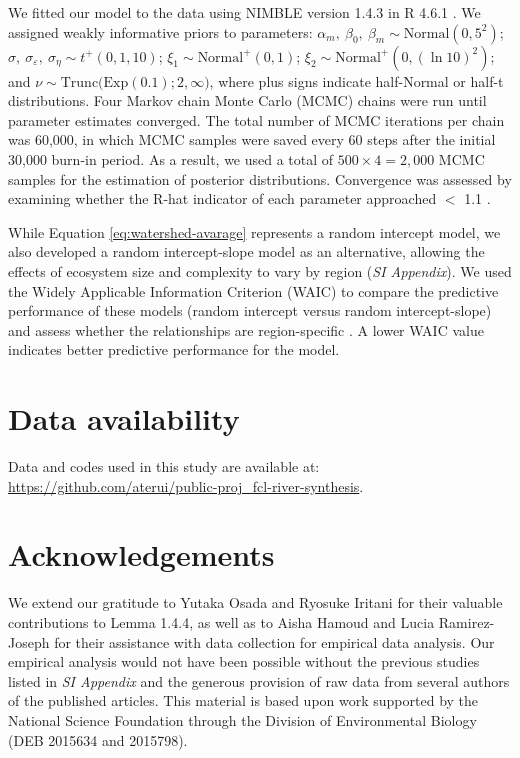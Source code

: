 \documentclass[9pt,twocolumn,twoside]{pnas-new}
\begin{document}
We fitted our model to the data using NIMBLE version 1.4.3 \citep{nimble, pkg_nimble} in R 4.6.1 \citep{r_program}.
We assigned weakly informative priors to parameters: $\alpha_m,~\beta_0,~\beta_m \sim \mbox{Normal}(0, 5^2)$; $\sigma,~\sigma_{\varepsilon},~\sigma_{\eta} \sim t^+(0, 1, 10)$; $\xi_1 \sim \mbox{Normal}^+(0, 1)$; $\xi_2 \sim \mbox{Normal}^+(0, (\ln 10)^2)$; and $\nu \sim \mbox{Trunc(Exp}(0.1); 2, \infty)$, where plus signs indicate half-Normal or half-t distributions. 
Four Markov chain Monte Carlo (MCMC) chains were run until parameter estimates
converged.
The total number of MCMC iterations per chain was 60,000, in which MCMC samples were saved every 60 steps after the initial 30,000 burn-in period.
As a result, we used a total of $500 \times 4 = 2,000$ MCMC samples for the estimation of posterior distributions.
Convergence was assessed by examining whether the R-hat indicator of each parameter approached $<$ 1.1 \citep{gelman2013bayesian}.

While Equation \ref{eq:watershed-avarage} represents a random intercept model, we also developed a random intercept-slope model as an alternative, allowing the effects of ecosystem size and complexity to vary by region (\textit{SI Appendix}).
We used the Widely Applicable Information Criterion (WAIC) to compare the predictive performance of these models (random intercept versus random intercept-slope) and assess whether the relationships are region-specific \citep{watanabe_asymptotic_2010}.
A lower WAIC value indicates better predictive performance for the model.

\section*{Data availability}

Data and codes used in this study are available at:
\url{https://github.com/aterui/public-proj_fcl-river-synthesis}.

\section*{Acknowledgements}

We extend our gratitude to Yutaka Osada and Ryosuke Iritani for their valuable contributions to Lemma 1.4.4, as well as to Aisha Hamoud and Lucia Ramirez-Joseph for their assistance with data collection for empirical data analysis.
Our empirical analysis would not have been possible without the previous studies listed in \textit{SI Appendix} and the generous provision of raw data from several authors of the published articles.
This material is based upon work supported by the National Science Foundation through the Division of Environmental Biology (DEB 2015634 and 2015798).


\end{document}
